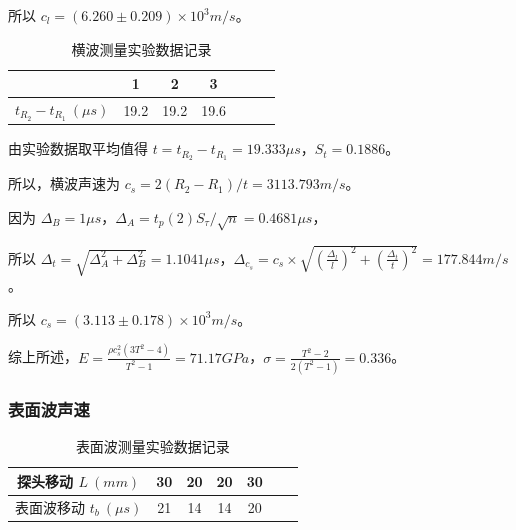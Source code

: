 \documentclass[a4paper]{article}
\begin{document}
            \par 所以 $c_l=(6.260\pm 0.209)\times 10^3m/s$。

            \begin{table}[H]
                \centering
                \begin{tabular}{|c|c|c|c|c|c|c|}
                    \hline
                                        & 1         & 2         & 3         \\ \hline
                    $t_{R_2}-t_{R_1}\ (\mu s)$  & 19.2      & 19.2      & 19.6      \\ \hline
                \end{tabular}
                \caption{横波测量实验数据记录}
            \end{table}

            \par 由实验数据取平均值得 $t=t_{R_2}-t_{R_1}=19.333\mu s$，$S_t=0.1886$。

            \par 所以，横波声速为 $c_s=2(R_2-R_1)/t=3113.793m/s$。

            \par 因为 $\Delta_B=1\mu s$，$\Delta_A=t_p(2)S_{\tau}/\sqrt{n}=0.4681\mu s$，

            \par 所以 $\Delta_t=\sqrt{\Delta^2_A+\Delta^2_B}=1.1041\mu s$，$\Delta_{c_s}=c_s\times\sqrt{(\frac{\Delta_l}{l})^2+(\frac{\Delta_t}{t})^2}=177.844m/s$。

            \par 所以 $c_s=(3.113\pm 0.178)\times 10^3m/s$。

            \par 综上所述，$E=\frac{\rho c_s^2(3T^2-4)}{T^2-1}=71.17GPa$，$\sigma=\frac{T^2-2}{2(T^2-1)}=0.336$。

        \subsubsection{表面波声速}

            \begin{table}[H]
                \centering
                \begin{tabular}{|c|c|c|c|c|c|c|}
                    \hline
                    探头移动 $L\ (mm)$          & 30    & 20    & 20    & 30 \\ \hline
                    表面波移动 $t_b\ (\mu s)$   & 21    & 14    & 14    & 20\\ \hline
                \end{tabular}
                \caption{表面波测量实验数据记录}
            \end{table}
\end{document}

